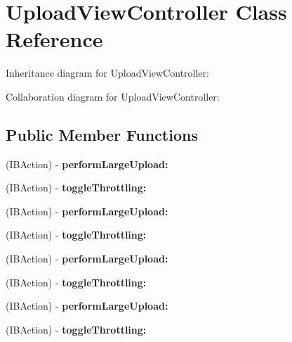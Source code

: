 \hypertarget{interface_upload_view_controller}{
\section{\-Upload\-View\-Controller \-Class \-Reference}
\label{interface_upload_view_controller}
}


\-Inheritance diagram for \-Upload\-View\-Controller\-:


\-Collaboration diagram for \-Upload\-View\-Controller\-:
\subsection*{\-Public \-Member \-Functions}
\begin{DoxyCompactItemize}
\item 
\hypertarget{interface_upload_view_controller_a9a5ec3323ab07e46d150f417af61d2b6}{
(\-I\-B\-Action) -\/ {\bfseries perform\-Large\-Upload\-:}}
\label{interface_upload_view_controller_a9a5ec3323ab07e46d150f417af61d2b6}

\item 
\hypertarget{interface_upload_view_controller_a50d20a503d9d145604640b30dc1ec9cb}{
(\-I\-B\-Action) -\/ {\bfseries toggle\-Throttling\-:}}
\label{interface_upload_view_controller_a50d20a503d9d145604640b30dc1ec9cb}

\item 
\hypertarget{interface_upload_view_controller_a9a5ec3323ab07e46d150f417af61d2b6}{
(\-I\-B\-Action) -\/ {\bfseries perform\-Large\-Upload\-:}}
\label{interface_upload_view_controller_a9a5ec3323ab07e46d150f417af61d2b6}

\item 
\hypertarget{interface_upload_view_controller_a50d20a503d9d145604640b30dc1ec9cb}{
(\-I\-B\-Action) -\/ {\bfseries toggle\-Throttling\-:}}
\label{interface_upload_view_controller_a50d20a503d9d145604640b30dc1ec9cb}

\item 
\hypertarget{interface_upload_view_controller_a9a5ec3323ab07e46d150f417af61d2b6}{
(\-I\-B\-Action) -\/ {\bfseries perform\-Large\-Upload\-:}}
\label{interface_upload_view_controller_a9a5ec3323ab07e46d150f417af61d2b6}

\item 
\hypertarget{interface_upload_view_controller_a50d20a503d9d145604640b30dc1ec9cb}{
(\-I\-B\-Action) -\/ {\bfseries toggle\-Throttling\-:}}
\label{interface_upload_view_controller_a50d20a503d9d145604640b30dc1ec9cb}

\item 
\hypertarget{interface_upload_view_controller_a9a5ec3323ab07e46d150f417af61d2b6}{
(\-I\-B\-Action) -\/ {\bfseries perform\-Large\-Upload\-:}}
\label{interface_upload_view_controller_a9a5ec3323ab07e46d150f417af61d2b6}

\item 
\hypertarget{interface_upload_view_controller_a50d20a503d9d145604640b30dc1ec9cb}{
(\-I\-B\-Action) -\/ {\bfseries toggle\-Throttling\-:}}
\label{interface_upload_view_controller_a50d20a503d9d145604640b30dc1ec9cb}

\end{DoxyCompactItemize}

